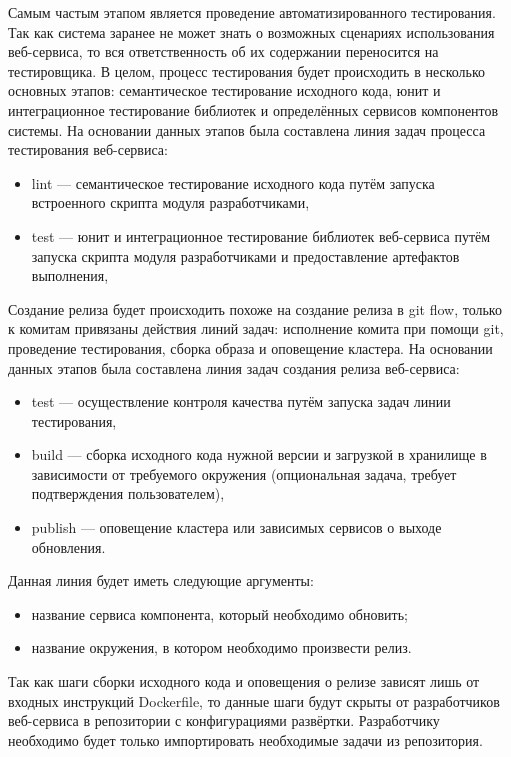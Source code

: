 Самым частым этапом является проведение автоматизированного тестирования.
Так как система заранее не может знать о возможных сценариях использования веб-сервиса, то вся ответственность об их содержании переносится на тестировщика.
В целом, процесс тестирования будет происходить в несколько основных этапов: семантическое тестирование исходного кода, юнит и интеграционное тестирование библиотек и
определённых сервисов компонентов системы.
На основании данных этапов была составлена линия задач процесса тестирования веб-сервиса:

\begin{itemize}
    \item lint --- семантическое тестирование исходного кода путём запуска встроенного скрипта модуля разработчиками,
    \item test --- юнит и интеграционное тестирование библиотек веб-сервиса путём запуска скрипта модуля разработчиками и предоставление артефактов выполнения,
\end{itemize}

Создание релиза будет происходить похоже на создание релиза в git flow, только к комитам привязаны действия линий задач:
исполнение комита при помощи git, проведение тестирования, сборка образа и оповещение кластера.
На основании данных этапов была составлена линия задач создания релиза веб-сервиса:

\begin{itemize}
    \item test --- осуществление контроля качества путём запуска задач линии тестирования,
    \item build --- сборка исходного кода нужной версии и загрузкой в хранилище в зависимости от требуемого окружения (опциональная задача, требует подтверждения пользователем),
    \item publish --- оповещение кластера или зависимых сервисов о выходе обновления.
\end{itemize}

Данная линия будет иметь следующие аргументы:

\begin{itemize}
    \item название сервиса компонента, который необходимо обновить;
    \item название окружения, в котором необходимо произвести релиз.
\end{itemize}

Так как шаги сборки исходного кода и оповещения о релизе зависят лишь от входных инструкций Dockerfile, то данные шаги будут
скрыты от разработчиков веб-сервиса в репозитории с конфигурациями развёртки.
Разработчику необходимо будет только импортировать необходимые задачи из репозитория.

